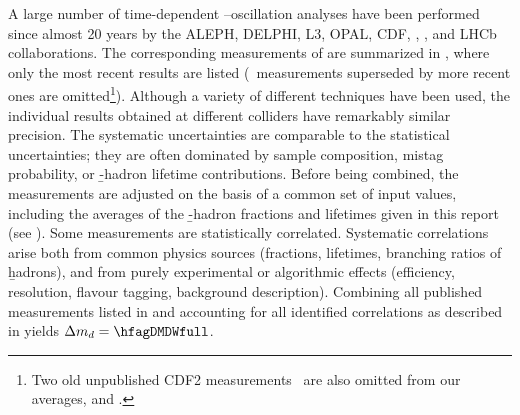 A large number of time-dependent \Bd--\Bdbar oscillation analyses
have been performed since almost 20 years by the 
ALEPH, DELPHI, L3, OPAL, CDF, \dzero, \babar, \belle and  LHCb collaborations. 
The corresponding measurements of \dmd are summarized in 
,
where only the most recent results
are listed (\ie\ measurements superseded by more recent ones are omitted\footnote{
  \label{foot:life_mix:CDFnote8235:2006}
  Two old unpublished CDF2 measurements~\cite{CDFnote8235:2006,CDFnote7920:2005}
  are also omitted from our averages,  and .}).
Although a variety of different techniques have been used, the 
individual \dmd
results obtained at different colliders have remarkably similar precision.
The systematic uncertainties are comparable to the statistical uncertainties;
they are often dominated by sample composition, mistag probability,
or \b-hadron lifetime contributions.
Before being combined, the measurements are adjusted on the basis of a 
common set of input values, including the averages of the 
\b-hadron fractions and lifetimes given in this report 
(see ).
Some measurements are statistically correlated. 
Systematic correlations arise both from common physics sources 
(fractions, lifetimes, branching ratios of \b hadrons), and from purely 
experimental or algorithmic effects (efficiency, resolution, flavour tagging, 
background description). Combining all published measurements
listed in 
and accounting for all identified correlations
as described in  yields $\dmd = \hfagDMDWfull$.

